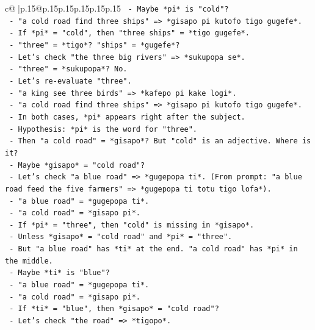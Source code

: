 \documentclass{article}
\begin{document}
{\begin{supertabular}{c@{$\;$}|p{.15\linewidth}@{}p{.15\linewidth}p{.15\linewidth}p{.15\linewidth}p{.15\linewidth}p{.15\linewidth}}
{{{\texttt{        {-} Maybe *pi* is "cold"?} \\
\texttt{        {-} "a cold road find three ships" => *gisapo pi kutofo tigo gugefe*.} \\
\texttt{        {-} If *pi* = "cold", then "three ships" = *tigo gugefe*.} \\
\texttt{        {-} "three" = *tigo*? "ships" = *gugefe*?} \\
\texttt{        {-} Let's check "the three big rivers" => *sukupopa se*.} \\
\texttt{        {-} "three" = *sukupopa*? No.} \\
\texttt{        {-} Let's re{-}evaluate "three".} \\
\texttt{        {-} "a king see three birds" => *kafepo pi kake logi*.} \\
\texttt{        {-} "a cold road find three ships" => *gisapo pi kutofo tigo gugefe*.} \\
\texttt{        {-} In both cases, *pi* appears right after the subject.} \\
\texttt{        {-} Hypothesis: *pi* is the word for "three".} \\
\texttt{        {-} Then "a cold road" = *gisapo*? But "cold" is an adjective. Where is it?} \\
\texttt{        {-} Maybe *gisapo* = "cold road"?} \\
\texttt{        {-} Let's check "a blue road" => *gugepopa ti*. (From prompt: "a blue road feed the five farmers" => *gugepopa ti totu tigo lofa*).} \\
\texttt{        {-} "a blue road" = *gugepopa ti*.} \\
\texttt{        {-} "a cold road" = *gisapo pi*.} \\
\texttt{        {-} If *pi* = "three", then "cold" is missing in *gisapo*.} \\
\texttt{        {-} Unless *gisapo* = "cold road" and *pi* = "three".} \\
\texttt{        {-} But "a blue road" has *ti* at the end. "a cold road" has *pi* in the middle.} \\
\texttt{        {-} Maybe *ti* is "blue"?} \\
\texttt{        {-} "a blue road" = *gugepopa ti*.} \\
\texttt{        {-} "a cold road" = *gisapo pi*.} \\
\texttt{        {-} If *ti* = "blue", then *gisapo* = "cold road"?} \\
\texttt{        {-} Let's check "the road" => *tigopo*.} \\
}}}
\end{supertabular}}
\end{document}
